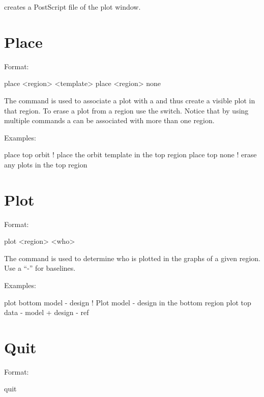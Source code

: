 \vskip 0.2in
 creates a PostScript file of the plot window. 

\section{Place}
\label{s:place}

Format:
\begin{example}
  place <region> <template>
  place <region> none
\end{example}

\vskip 0.2in The  command is used to associate a
 plot with a  and thus create a visible
plot in that region. To erase a plot from a region use the 
switch. Notice that by using multiple  commands a
 can be associated with more than one region. 

Examples:
\begin{example}
  place top orbit  ! place the orbit template in the top region
  place top none   ! erase any plots in the top region
\end{example}

\section{Plot}
\label{s:plot}

Format:
\begin{example}
  plot <region> <who>
\end{example}

\vskip 0.2in The  command is used to determine who is plotted
in the graphs of a given region. Use a ``-'' for baselines. 

Examples:
\begin{example}
  plot bottom model - design       ! Plot model - design in the bottom region
  plot top data - model + design - ref 
\end{example}

\section{Quit}
\label{s:quit}

Format:
\begin{example}
  quit
\end{example}

